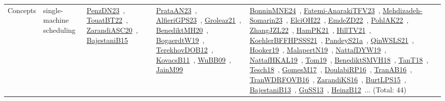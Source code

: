 {\begin{longtable}{lp{3cm}>{\raggedright\arraybackslash}p{6cm}>{\raggedright\arraybackslash}p{6cm}>{\raggedright\arraybackslash}p{8cm}}
Concepts & single-machine scheduling & \href{../works/PenzDN23.pdf}{PenzDN23}~\cite{PenzDN23}, \href{../works/TouatBT22.pdf}{TouatBT22}~\cite{TouatBT22}, \href{../works/ZarandiASC20.pdf}{ZarandiASC20}~\cite{ZarandiASC20}, \href{../works/BajestaniB15.pdf}{BajestaniB15}~\cite{BajestaniB15} & \href{../works/PrataAN23.pdf}{PrataAN23}~\cite{PrataAN23}, \href{../works/AlfieriGPS23.pdf}{AlfieriGPS23}~\cite{AlfieriGPS23}, \href{../works/Groleaz21.pdf}{Groleaz21}~\cite{Groleaz21}, \href{../works/BenediktMH20.pdf}{BenediktMH20}~\cite{BenediktMH20}, \href{../works/BogaerdtW19.pdf}{BogaerdtW19}~\cite{BogaerdtW19}, \href{../works/TerekhovDOB12.pdf}{TerekhovDOB12}~\cite{TerekhovDOB12}, \href{../works/KovacsB11.pdf}{KovacsB11}~\cite{KovacsB11}, \href{../works/WuBB09.pdf}{WuBB09}~\cite{WuBB09}, \href{../works/JainM99.pdf}{JainM99}~\cite{JainM99} & \href{../works/BonninMNE24.pdf}{BonninMNE24}~\cite{BonninMNE24}, \href{../works/Fatemi-AnarakiTFV23.pdf}{Fatemi-AnarakiTFV23}~\cite{Fatemi-AnarakiTFV23}, \href{../works/Mehdizadeh-Somarin23.pdf}{Mehdizadeh-Somarin23}~\cite{Mehdizadeh-Somarin23}, \href{../works/ElciOH22.pdf}{ElciOH22}~\cite{ElciOH22}, \href{../works/EmdeZD22.pdf}{EmdeZD22}~\cite{EmdeZD22}, \href{../works/PohlAK22.pdf}{PohlAK22}~\cite{PohlAK22}, \href{../works/ZhangJZL22.pdf}{ZhangJZL22}~\cite{ZhangJZL22}, \href{../works/HamPK21.pdf}{HamPK21}~\cite{HamPK21}, \href{../works/HillTV21.pdf}{HillTV21}~\cite{HillTV21}, \href{../works/KoehlerBFFHPSSS21.pdf}{KoehlerBFFHPSSS21}~\cite{KoehlerBFFHPSSS21}, \href{../works/PandeyS21a.pdf}{PandeyS21a}~\cite{PandeyS21a}, \href{../works/QinWSLS21.pdf}{QinWSLS21}~\cite{QinWSLS21}, \href{../works/Hooker19.pdf}{Hooker19}~\cite{Hooker19}, \href{../works/MalapertN19.pdf}{MalapertN19}~\cite{MalapertN19}, \href{../works/NattafDYW19.pdf}{NattafDYW19}~\cite{NattafDYW19}, \href{../works/NattafHKAL19.pdf}{NattafHKAL19}~\cite{NattafHKAL19}, \href{../works/Tom19.pdf}{Tom19}~\cite{Tom19}, \href{../works/BenediktSMVH18.pdf}{BenediktSMVH18}~\cite{BenediktSMVH18}, \href{../works/TanT18.pdf}{TanT18}~\cite{TanT18}, \href{../works/Tesch18.pdf}{Tesch18}~\cite{Tesch18}, \href{../works/GomesM17.pdf}{GomesM17}~\cite{GomesM17}, \href{../works/DoulabiRP16.pdf}{DoulabiRP16}~\cite{DoulabiRP16}, \href{../works/TranAB16.pdf}{TranAB16}~\cite{TranAB16}, \href{../works/TranWDRFOVB16.pdf}{TranWDRFOVB16}~\cite{TranWDRFOVB16}, \href{../works/ZarandiKS16.pdf}{ZarandiKS16}~\cite{ZarandiKS16}, \href{../works/BurtLPS15.pdf}{BurtLPS15}~\cite{BurtLPS15}, \href{../works/BajestaniB13.pdf}{BajestaniB13}~\cite{BajestaniB13}, \href{../works/GuSS13.pdf}{GuSS13}~\cite{GuSS13}, \href{../works/HeinzB12.pdf}{HeinzB12}~\cite{HeinzB12}... (Total: 44)\\

\end{longtable}}
